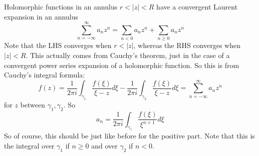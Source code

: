 \documentclass{article}
\begin{document}
Holomorphic functions in an annulus \(r < |z| < R\) have a convergent Laurent expansion in an annulus
\begin{equation}\sum_{n = -\infty}^\infty a_nz^n = \sum_{n < 0}a_nz^n + \sum_{n \geq 0}a_nz^n\end{equation}
Note that the LHS converges when \(r < |z|\), whereas the RHS converges when \(|z| < R\). This actually comes from Cauchy's theorem, just in the case of a convergent power series expansion of a holomorphic function. So this is from Cauchy's integral formula:
\begin{equation}f(z) = \frac{1}{2\pi i}\int_{\gamma_1}\frac{f(\xi)}{\xi - z}d\xi - \frac{1}{2\pi i}\int_{\gamma_2}\frac{f(\xi)}{\xi - z}d\xi = \sum_{n = -\infty}^\infty a_nz^n\end{equation}
for \(z\) between \(\gamma_1, \gamma_2\).
So
\begin{equation}a_n = \frac{1}{2\pi i}\int_{\gamma_?}\frac{f(\xi)}{\xi^{n + 1}}d\xi\end{equation}
So of course, this should be just like before for the positive part. Note that this is the integral over \(\gamma_1\) if \(n \geq 0\) and over \(\gamma_2\) if \(n < 0\).
\end{document}
